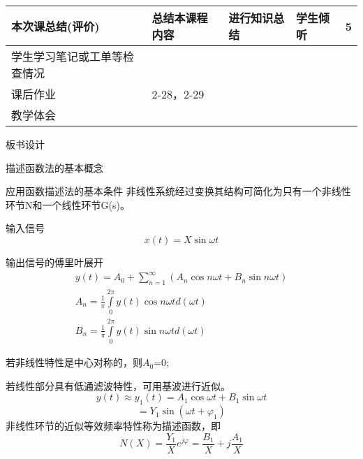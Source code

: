{\begin{landscape}
\begin{longtable}{|m{10mm}|m{50mm}|m{50mm}|m{50mm}|m{15mm}|}
\centering 本次课总结(评价)&总结本课程内容 &进行知识总结 &学生倾听 &5 \\\hline
\centering 学生学习笔记或工单等检查情况&\multicolumn{4}{m{165mm}|}{\quad}\\\hline
\centering 课后作业&\multicolumn{4}{m{165mm}|}{2-28，2-29}\\\hline
\centering 教学体会&\multicolumn{4}{m{165mm}|}{\quad}\\
\end{longtable}

\end{landscape}
\clearpage
\begin{center}
{\huge 板书设计}
\end{center}
}

 \begin{frame}{描述函数法的基本概念} 
 \begin{block}{应用函数描述法的基本条件}
非线性系统经过变换其结构可简化为只有一个非线性环节N和一个线性环节G(s)。
 \end{block}
 \begin{block}{输入信号}
 \[x(t)=X\sin \omega t\]
 \end{block}
 \end{frame}
 
 \begin{frame}
 \begin{block}{输出信号的傅里叶展开}
\begin{eqnarray*}
y(t)=A_0+\sum\limits_{n=1}^\infty(A_n\cos n\omega t+B_n\sin n\omega t)\\
A_n=\frac{1}{\pi}\int\limits_0^{2\pi}y(t)\cos n\omega t d(\omega t)\\
B_n=\frac{1}{\pi}\int\limits_0^{2\pi}y(t)\sin n\omega t d(\omega t)
\end{eqnarray*}
\end{block}
\end{frame}

\begin{frame}
\begin{block}{}
若非线性特性是中心对称的，则$A_0$=0;

若线性部分具有低通滤波特性，可用基波进行近似。
\[y(t)\approx y_1(t)=A_1\cos\omega t+B_1\sin\omega t\]
\[=Y_1\sin (\omega t+\varphi_1)\]
非线性环节的近似等效频率特性称为描述函数，即
\[N(X)=\frac{Y_1}{X}e^{j\varphi}=\frac{B_1}{X}+j\frac{A_1}{X}\]
\end{block}
\end{frame}

